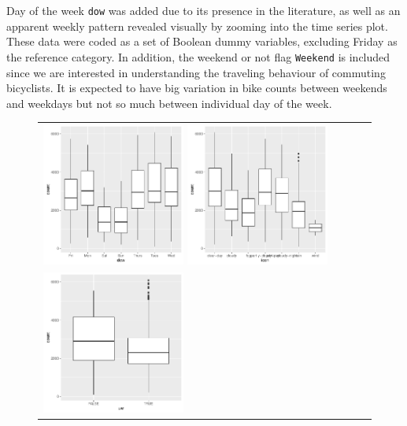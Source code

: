 \documentclass [11pt, proquest] {uwthesis}[2015/03/03]
\begin{document}
Day of the week \texttt{dow} was added due to its presence in the literature, as well as an apparent weekly pattern revealed visually by zooming into the time series plot. These data were coded as a set of Boolean dummy variables, excluding Friday as the reference category. In addition, the weekend or not flag \texttt{Weekend} is included since we are interested in understanding the traveling behaviour of commuting bicyclists. It is expected to have big variation in bike counts between weekends and weekdays but not so much between individual day of the week. 


\begin{figure}
\vspace{-40pt}
\begin{tabular}{ll}
\includegraphics[width=0.45\textwidth]{figures/dow_cat}
\includegraphics[width=0.45\textwidth]{figures/icon_cat}\\
\includegraphics[width=0.45\textwidth]{figures/uw_cat}

\end{tabular}
\end{figure}
\end{document}
